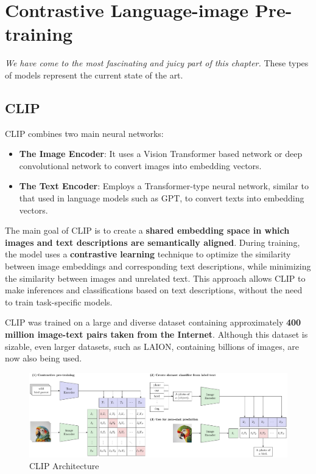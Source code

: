 \section{Contrastive Language-image Pre-training}

\textit{We have come to the most fascinating and juicy part of this chapter.} These types of models represent the current state of the art. 

\subsection{CLIP}

CLIP combines two main neural networks:
\begin{itemize}
    \item \textbf{The Image Encoder}: It uses a Vision Transformer based network or deep convolutional network to convert images into embedding vectors.
    \item \textbf{The Text Encoder}: Employs a Transformer-type neural network, similar to that used in language models such as GPT, to convert texts into embedding vectors.
\end{itemize}

The main goal of CLIP is to create a \textbf{shared embedding space in which images and text descriptions are semantically aligned}. During training, the model uses a \textbf{contrastive learning} technique to optimize the similarity between image embeddings and corresponding text descriptions, while minimizing the similarity between images and unrelated text. This approach allows CLIP to make inferences and classifications based on text descriptions, without the need to train task-specific models.

CLIP was trained on a large and diverse dataset containing approximately \textbf{400 million image-text pairs taken from the Internet}. Although this dataset is sizable, even larger datasets, such as LAION, containing billions of images, are now also being used.

\begin{figure}[!htbp]
    \centering
    \includegraphics[width=\linewidth]{tikz/chapter11 - CLIP.pdf}
    \caption{CLIP Architecture}
\end{figure}

